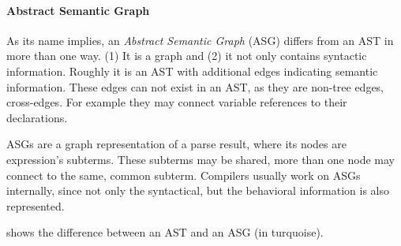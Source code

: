 \paragraph{Abstract Semantic Graph}
As its name implies, an \emph{Abstract Semantic Graph} (ASG) differs from an AST in more than one way. (1) It is a graph and (2) it not only contains syntactic information. Roughly it is an AST with additional edges indicating semantic information. These edges can not exist in an AST, as they are non-tree edges, cross-edges. For example they may connect variable references to their declarations.~\cite{raghavan_dex:_2004}

ASGs are a graph representation of a parse result, where its nodes are expression's subterms. These subterms may be shared, more than one node may connect to the same, common subterm. Compilers usually work on ASGs internally, since  not only the syntactical, but the behavioral information is also represented.


 shows the difference between an AST and an ASG (in turquoise).

